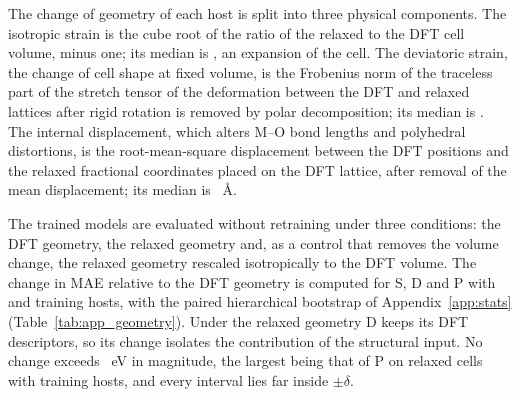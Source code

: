 The change of geometry of each host is split into three physical components. The isotropic strain is the cube root of the ratio of the relaxed to the DFT cell volume, minus one; its median is \numNetGeomIsotropicStrainMedian{}, an expansion of the cell. The deviatoric strain, the change of cell shape at fixed volume, is the Frobenius norm of the traceless part of the stretch tensor of the deformation between the DFT and relaxed lattices after rigid rotation is removed by polar decomposition; its median is \numNetGeomDeviatoricStrainMedian{}. The internal displacement, which alters M--O bond lengths and polyhedral distortions, is the root-mean-square displacement between the DFT positions and the relaxed fractional coordinates placed on the DFT lattice, after removal of the mean displacement; its median is \numNetGeomInternalRmsdMedian{}~\AA{}.

The trained models are evaluated without retraining under three conditions: the DFT geometry, the relaxed geometry and, as a control that removes the volume change, the relaxed geometry rescaled isotropically to the DFT volume. The change in MAE relative to the DFT geometry is computed for S, D and P with \numCfgBudgetsHostsItemFour{} and \numCfgBudgetsMax{} training hosts, with the paired hierarchical bootstrap of Appendix~\ref{app:stats} (Table~\ref{tab:app_geometry}). Under the relaxed geometry D keeps its DFT descriptors, so its change isolates the contribution of the structural input. No change exceeds \numNetGeomMaxAbsDeltaMae{}~eV in magnitude, the largest being that of P on relaxed cells with \numCfgBudgetsMax{} training hosts, and every interval lies far inside $\pm\delta$.

